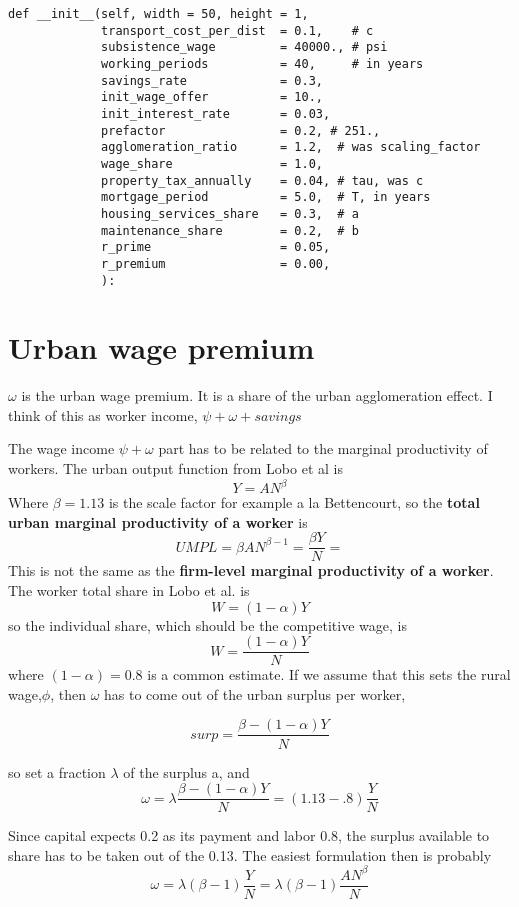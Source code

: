 \begin{lstlisting}
def __init__(self, width = 50, height = 1,
             transport_cost_per_dist  = 0.1,    # c
             subsistence_wage         = 40000., # psi
             working_periods          = 40,     # in years
             savings_rate             = 0.3,
             init_wage_offer          = 10.,
             init_interest_rate       = 0.03,
             prefactor                = 0.2, # 251., 
             agglomeration_ratio      = 1.2,  # was scaling_factor
             wage_share               = 1.0,
             property_tax_annually    = 0.04, # tau, was c
             mortgage_period          = 5.0,  # T, in years
             housing_services_share   = 0.3,  # a
             maintenance_share        = 0.2,  # b
             r_prime                  = 0.05,
             r_premium                = 0.00,
             ):
\end{lstlisting}


\section{Urban wage premium}

$\omega$ is the urban wage premium. It is a share of the urban agglomeration effect. 
I think of this as worker income, $\psi+\omega+savings$ 

The wage income  $\psi+\omega$ part has to be related to the marginal productivity of workers. The urban output function from Lobo et al \cite{loboUrbanScalingProduction2013} is  
\[Y=AN^\beta\]
Where $\beta=1.13$ is the scale factor for example  a la Bettencourt, so the \textbf{total urban marginal productivity of a worker} is  
\[UMPL=\beta AN^{\beta-1}=\frac{\beta Y}{N} =\]
This is not the same as the \textbf{firm-level marginal productivity of a worker}. The worker total share in Lobo et al. is \[W= (1-\alpha)Y \] 
so the individual share, which should be the competitive wage, is
\[W= \frac{(1-\alpha)Y}{N} \] 
where $(1-\alpha)=0.8$ is a common estimate. If we assume that this sets the rural wage,$\phi$, then $\omega$ has to come out of the  urban surplus per worker,

\[surp= \frac{\beta -(1-\alpha)Y}{N} \] 

 so set a fraction $\lambda$ of the surplus a, and 
 \[\omega= \lambda\frac{\beta -(1-\alpha)Y}{N}= (1.13-.8) \frac{Y}{N} \] 

 Since capital expects 0.2 as its payment and labor 0.8, the surplus available to share has to be taken out of the 0.13. The easiest formulation then is probably 
 \[\omega= \lambda(\beta -1) \frac{Y}{N} =\lambda(\beta -1) \frac{AN^\beta}{N} \] 
 

